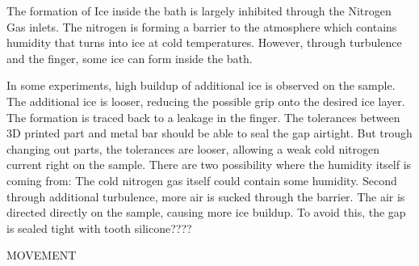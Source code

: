 The formation of Ice inside the bath is largely inhibited through the Nitrogen Gas inlets. The nitrogen is forming a barrier to the atmosphere which contains humidity that turns into ice at cold temperatures. However, through turbulence and the finger, some ice can form inside the bath. 

In some experiments, high buildup of additional ice is observed on the sample. The additional ice is looser, reducing the possible grip onto the desired ice layer. The formation is traced back to a leakage in the finger. The tolerances between 3D printed part and metal bar should be able to seal the gap airtight. But trough changing out parts, the tolerances are looser, allowing a weak cold nitrogen current right on the sample. There are two possibility where the humidity itself is coming from: The cold nitrogen gas itself could contain some humidity. Second through additional turbulence, more air is sucked through the barrier. The air is directed directly on the sample, causing more ice buildup. To avoid this, the gap is sealed tight with tooth silicone????

MOVEMENT


